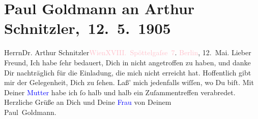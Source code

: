 

\renewcommand{\erwaehntePersonen}{Personen: Louise Schnitzler, Olga Schnitzler}
\renewcommand{\erwaehnteOrte}{Orte: Berlin, Edmund-Weiß-Gasse, Wien}
\renewcommand{\erwaehnteWerke}{}
\section[ Paul Goldmann an Arthur Schnitzler, 12. 5. 1905]{Paul Goldmann an Arthur Schnitzler, 12. 5. 1905}
\nopagebreak{}
\rehead{ }\normalsize\beginnumbering{}
\toendnotes[C]{\smallbreak\pagebreak[2]}
\toendnotes[C]{\smallbreak}\pstart{}{\pb}Herrn\pend{}\pstart{}Dr. Arthur Schnitzler\pend{}\pstart{}\textcolor{pink}{Wien}{}\ledrightnote{\textcolor{pink}{Wien}}\pend{}\pstart{}\textcolor{pink}{XVIII. Spöttelgaſse 7}{}\ledrightnote{\textcolor{pink}{Edmund-Weiß-Gasse}}.\pend{}
{\bigskip}
\pstart
           \noindent{}{\pb}\textcolor{pink}{Berlin}{}\ledrightnote{\textcolor{pink}{Berlin}}, 12. Mai.
                  Lieber Freund, Ich habe ſehr bedauert, Dich in
                  \label{K_L03232-1v}\label{K_L03232-1h} nicht angetroffen zu haben, und danke
               Dir nachträglich für die Einladung, die mich nicht erreicht hat. Hoffentlich gibt mir
               der \label{K_L03232-2v}\label{K_L03232-2h} Gelegenheit, Dich zu ſehen. Laß’ mich jedenfalls wiſſen, wo
               Du biſt. Mit Deiner \textcolor{blue}{Mutter}{}\ledrightnote{{$\rightarrow$}\textcolor{blue}{Louise Schnitzler}}
               habe ich ſo halb und halb ein Zuſammentreffen verabredet. Herzliche Grüße an Dich und
               Deine \textcolor{blue}{Frau}{}\ledrightnote{{$\rightarrow$}\textcolor{blue}{Olga Schnitzler}} von Deinem {\\}\spacefill\mbox{Paul Goldmann.}\pend
           
